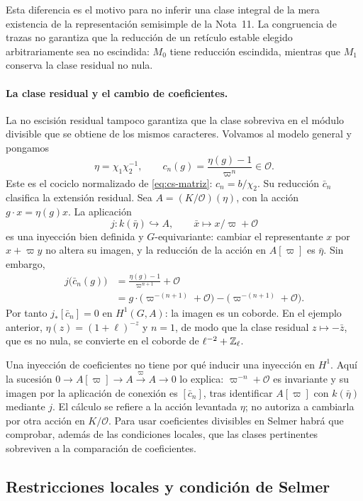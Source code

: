 Esta diferencia es el motivo para no inferir una clase
integral de la mera existencia de la representación
semisimple de la Nota~11. La congruencia de trazas no garantiza
que la reducción de un retículo estable elegido arbitrariamente
sea no escindida: $M_0$ tiene reducción escindida, mientras que
$M_1$ conserva la clase residual no nula.

\paragraph{La clase residual y el cambio de coeficientes.}
La no escisión residual tampoco garantiza que la clase sobreviva
en el módulo divisible que se obtiene de los mismos caracteres.
Volvamos al modelo general y pongamos
\[
 \eta=\chi_1\chi_2^{-1},\qquad
 c_n(g)=\frac{\eta(g)-1}{\varpi^n}\in\mathcal O.
\]
Este es el cociclo normalizado de \eqref{eq:cs-matriz}:
$c_n=b/\chi_2$. Su reducción $\bar c_n$ clasifica la extensión
residual. Sea $A=(K/\mathcal O)(\eta)$, con la acción
$g\cdot x=\eta(g)x$. La aplicación
\[
 j:k(\bar\eta)\hookrightarrow A,\qquad
 \bar x\longmapsto x/\varpi+\mathcal O
\]
es una inyección bien definida y $G$-equivariante: cambiar
el representante $x$ por $x+\varpi y$ no altera su imagen,
y la reducción de la acción en $A[\varpi]$ es $\bar\eta$.
Sin embargo,
\[
 \begin{aligned}
 j\bigl(\bar c_n(g)\bigr)
 &=\frac{\eta(g)-1}{\varpi^{n+1}}+\mathcal O\\
 &=g\cdot\bigl(\varpi^{-(n+1)}+\mathcal O\bigr)
   -\bigl(\varpi^{-(n+1)}+\mathcal O\bigr).
 \end{aligned}
\]
Por tanto $j_*[\bar c_n]=0$ en $H^1(G,A)$: la imagen
es un coborde. En el ejemplo anterior,
$\eta(z)=(1+\ell)^{-z}$ y $n=1$, de modo que la clase
residual $z\mapsto-\bar z$, que es no nula, se convierte
en el coborde de $\ell^{-2}+\mathbb{Z}_\ell$.

Una inyección de coeficientes no tiene por qué inducir una
inyección en $H^1$. Aquí la sucesión
$0\to A[\varpi]\to A\xrightarrow{\varpi}A\to0$
lo explica: $\varpi^{-n}+\mathcal O$ es invariante y su
imagen por la aplicación de conexión es $[\bar c_n]$,
tras identificar $A[\varpi]$ con $k(\bar\eta)$ mediante $j$.
El cálculo se refiere a la acción levantada $\eta$;
no autoriza a cambiarla por otra acción en $K/\mathcal O$.
Para usar coeficientes divisibles en Selmer habrá que comprobar,
además de las condiciones locales, que las clases pertinentes
sobreviven a la comparación de coeficientes.

\subsection{Restricciones locales y condición de Selmer}

